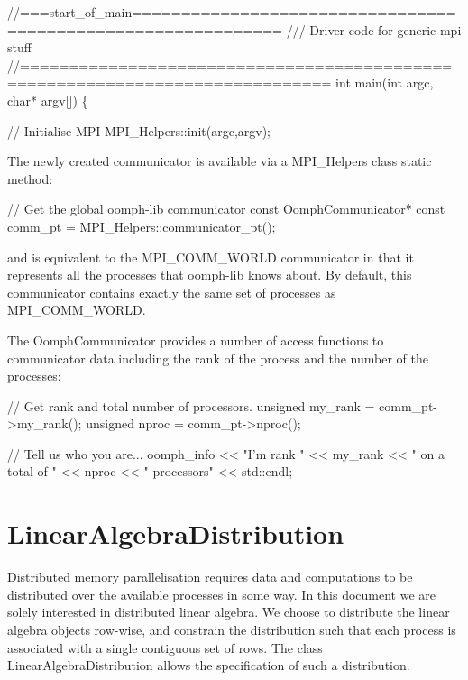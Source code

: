  
\begin{DoxyCodeInclude}
\textcolor{comment}{//===start\_of\_main=============================================================}
\textcolor{comment}{/// Driver code for generic mpi stuff}
\textcolor{comment}{}\textcolor{comment}{//=============================================================================}
\textcolor{keywordtype}{int} main(\textcolor{keywordtype}{int} argc, \textcolor{keywordtype}{char}* argv[])
\{

  \textcolor{comment}{// Initialise MPI}
  MPI\_Helpers::init(argc,argv);

\end{DoxyCodeInclude}


The newly created communicator is available via a {\ttfamily M\+P\+I\+\_\+\+Helpers} class static method\+:


\begin{DoxyCodeInclude}
  \textcolor{comment}{// Get the global oomph-lib communicator }
  \textcolor{keyword}{const} OomphCommunicator* \textcolor{keyword}{const} comm\_pt = MPI\_Helpers::communicator\_pt();

\end{DoxyCodeInclude}


and is equivalent to the {\ttfamily M\+P\+I\+\_\+\+C\+O\+M\+M\+\_\+\+W\+O\+R\+LD} communicator in that it represents all the processes that {\ttfamily oomph-\/lib} knows about. By default, this communicator contains exactly the same set of processes as {\ttfamily M\+P\+I\+\_\+\+C\+O\+M\+M\+\_\+\+W\+O\+R\+LD}.

The {\ttfamily Oomph\+Communicator} provides a number of access functions to communicator data including the rank of the process and the number of the processes\+:


\begin{DoxyCodeInclude}

  \textcolor{comment}{// Get rank and total number of processors. }
  \textcolor{keywordtype}{unsigned} my\_rank = comm\_pt->my\_rank();
  \textcolor{keywordtype}{unsigned} nproc = comm\_pt->nproc();

  \textcolor{comment}{// Tell us who you are...}
  oomph\_info << \textcolor{stringliteral}{"I'm rank "} << my\_rank << \textcolor{stringliteral}{" on a total of "}
             << nproc << \textcolor{stringliteral}{" processors"} << std::endl;

\end{DoxyCodeInclude}
\hypertarget{index_linear_algebra_distribution}{}\section{Linear\+Algebra\+Distribution}\label{index_linear_algebra_distribution}
Distributed memory parallelisation requires data and computations to be distributed over the available processes in some way. In this document we are solely interested in distributed linear algebra. We choose to distribute the linear algebra objects row-\/wise, and constrain the distribution such that each process is associated with a single contiguous set of rows. The class {\ttfamily Linear\+Algebra\+Distribution} allows the specification of such a distribution.

